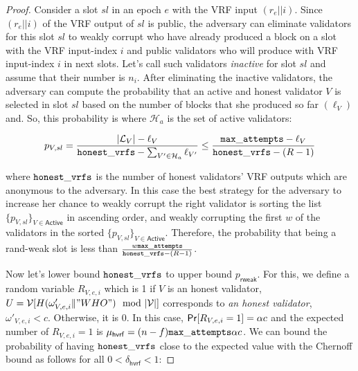 \begin{proof}
	Consider a slot $ sl $ in an epoch $ e $ with the VRF input $ (r_e||i) $. Since $ (r_e||i) $ of the VRF output of $ sl $ is public, the adversary can eliminate validators for this slot $ sl $ to weakly corrupt who have already produced a block on a slot with the VRF input-index $ i $ and public validators who will produce with VRF input-index $ i $ in next slots. Let's call such validators \emph{inactive} for slot $ sl $ and assume that their number is $ n_i $. After eliminating the inactive validators, the adversary can compute the probability that an active  and honest validator $ V $ is selected in slot $ sl $ based on the number of blocks that she produced so far $ (\ell_V) $ and. So, this probability is where $ \mathcal{H}_a$ is the set of active validators:
	
	
	\begin{equation}\label{eq:prVs}
	p_{V,sl} = \frac{|\mathcal{L}_V|- \ell_V}{\mathtt{honest\_vrfs} - \sum_{V' \in \mathcal{H}_a}\ell_{V'}}\leq \frac{\mathtt{max\_attempts} - \ell_V}{\mathtt{honest\_vrfs} - (R-1)}
	\end{equation}
	
	
	where $ \mathtt{honest\_vrfs} $ is the number of honest validators' VRF outputs which are anonymous to the adversary.
	In this case the best strategy for the adversary to increase her chance to  weakly corrupt the right validator  is sorting the list $ \{p_{V,sl}\}_{V \in \mathsf{Active}} $ in ascending order, and weakly corrupting the first $ w $ of the validators in the sorted $ \{p_{V,sl}\}_{V \in \mathsf{Active}} $. Therefore, the probability that being a rand-weak slot is less than $  \frac{w\mathtt{max\_attempts} }{\mathtt{honest\_vrfs} - (R-1)}  $.
	
	Now let's lower bound $ \mathtt{honest\_vrfs} $ to upper bound $ p_{\mathsf{rweak}} $.	For this, we define a random variable $ R_{V,e,i} $ which is 1 if $ V $ is an honest validator, $ U = \mathcal{V}[H(\omega'_{V,e,i} \| "WHO") \mod |\mathcal{V}|]  $ corresponds to  \emph{an honest validator}, $ \omega'_{V,e,i} < c $. Otherwise, it is 0.  In this case, $ \mathsf{Pr}[R_{V,e,i} = 1] = \alpha c$ and
	the expected number of $ R_{V,e,i}  = 1$ is  $ \mu_{\mathsf{hvrf}} = (n-f) \mathtt{max\_attempts} \alpha c $. We can bound the probability of having $ \mathtt{honest\_vrfs} $ close to the expected value with  the Chernoff bound as follows for all $ 0 <\delta_{\mathsf{hvrf}} < 1 	 $:
	

\end{proof}
